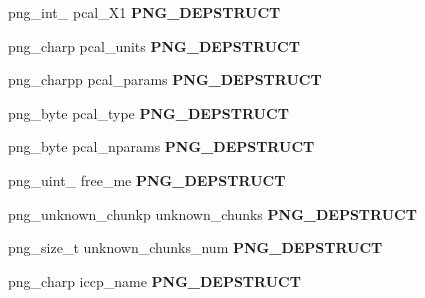 \begin{DoxyCompactItemize}
\item 
\hypertarget{structpng__info__struct_af4c46785485ad93d7fdfc80bb0f40887}{png\-\_\-int\-\_ pcal\-\_\-\-X1 {\bfseries P\-N\-G\-\_\-\-D\-E\-P\-S\-T\-R\-U\-C\-T}}\label{structpng__info__struct_af4c46785485ad93d7fdfc80bb0f40887}

\item 
\hypertarget{structpng__info__struct_a875d95339a5fdecb416f357c152ef745}{png\-\_\-charp pcal\-\_\-units {\bfseries P\-N\-G\-\_\-\-D\-E\-P\-S\-T\-R\-U\-C\-T}}\label{structpng__info__struct_a875d95339a5fdecb416f357c152ef745}

\item 
\hypertarget{structpng__info__struct_a64e4492175b6ae8a4968352d3ce648d6}{png\-\_\-charpp pcal\-\_\-params {\bfseries P\-N\-G\-\_\-\-D\-E\-P\-S\-T\-R\-U\-C\-T}}\label{structpng__info__struct_a64e4492175b6ae8a4968352d3ce648d6}

\item 
\hypertarget{structpng__info__struct_ab8dddb306fedbde5d126d3e72bd9d07e}{png\-\_\-byte pcal\-\_\-type {\bfseries P\-N\-G\-\_\-\-D\-E\-P\-S\-T\-R\-U\-C\-T}}\label{structpng__info__struct_ab8dddb306fedbde5d126d3e72bd9d07e}

\item 
\hypertarget{structpng__info__struct_af9a3c2c714f850646092897a7f4ce1eb}{png\-\_\-byte pcal\-\_\-nparams {\bfseries P\-N\-G\-\_\-\-D\-E\-P\-S\-T\-R\-U\-C\-T}}\label{structpng__info__struct_af9a3c2c714f850646092897a7f4ce1eb}

\item 
\hypertarget{structpng__info__struct_a79ba48435e223e17c03ef297d2b9b6e7}{png\-\_\-uint\-\_ free\-\_\-me {\bfseries P\-N\-G\-\_\-\-D\-E\-P\-S\-T\-R\-U\-C\-T}}\label{structpng__info__struct_a79ba48435e223e17c03ef297d2b9b6e7}

\item 
\hypertarget{structpng__info__struct_a21f80e93312ba086e49103f3689d6c44}{png\-\_\-unknown\-\_\-chunkp unknown\-\_\-chunks {\bfseries P\-N\-G\-\_\-\-D\-E\-P\-S\-T\-R\-U\-C\-T}}\label{structpng__info__struct_a21f80e93312ba086e49103f3689d6c44}

\item 
\hypertarget{structpng__info__struct_ad3ec26085db213daeecf98432cb405fc}{png\-\_\-size\-\_\-t unknown\-\_\-chunks\-\_\-num {\bfseries P\-N\-G\-\_\-\-D\-E\-P\-S\-T\-R\-U\-C\-T}}\label{structpng__info__struct_ad3ec26085db213daeecf98432cb405fc}

\item 
\hypertarget{structpng__info__struct_ac0a443dae663a1482c7213dea082a8dd}{png\-\_\-charp iccp\-\_\-name {\bfseries P\-N\-G\-\_\-\-D\-E\-P\-S\-T\-R\-U\-C\-T}}\label{structpng__info__struct_ac0a443dae663a1482c7213dea082a8dd}


\end{DoxyCompactItemize}
